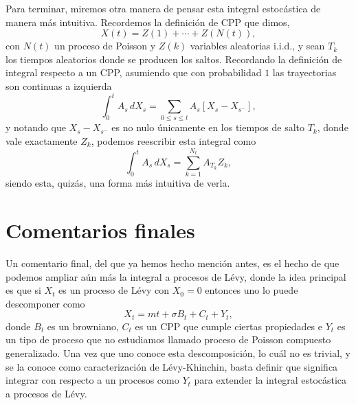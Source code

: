 \documentclass[
marginals=nomargin
]{kaohandt}
\begin{document}
	
	Para terminar, miremos otra manera de pensar esta integral estocástica de manera más intuitiva. Recordemos la definición de CPP que dimos,
	$$
	X(t) = Z(1) + \cdots + Z(N(t)),
	$$
	con $N(t)$ un proceso de Poisson y $Z(k)$ variables aleatorias i.i.d., y sean $T_k$ los tiempos aleatorios donde se producen los saltos. Recordando la definición de integral respecto a un CPP, asumiendo que con probabilidad $1$ las trayectorias son continuas a izquierda
	$$
	\int_0^t A_s\, dX_s = \sum_{0 \leq s \leq t} A_s [X_s - X_{s^-}],
	$$
	y notando que $X_s - X_{s^-}$ es no nulo únicamente en los tiempos de salto $T_k$, donde vale exactamente $Z_k$, podemos reescribir esta integral como
	$$
	\int_0^t A_s\, dX_s = \sum_{k=1}^{N_t} A_{T_k} Z_k,
	$$
	siendo esta, quizás, una forma más intuitiva de verla.
	
	\section{Comentarios finales}
	
	Un comentario final, del que ya hemos hecho mención antes, es el hecho de que podemos ampliar aún más la integral a procesos de Lévy, donde la idea principal es que si $X_t$ es un proceso de Lévy con $X_0 = 0$ entonces uno lo puede descomponer como
	$$ X_t = mt + \sigma B_t + C_t + Y_t,$$
	donde $B_t$ es un browniano, $C_t$ es un CPP que cumple ciertas propiedades e $Y_t$ es un tipo de proceso que no estudiamos llamado proceso de Poisson compuesto generalizado. Una vez que uno conoce esta descomposición, lo cuál no es trivial, y se la conoce como caracterización de Lévy-Khinchin, basta definir que significa integrar con respecto a un procesos como $Y_t$ para extender la integral estocástica a procesos de Lévy. 

\nocite{*}
\printbibliography[heading=bibintoc]
\end{document}
